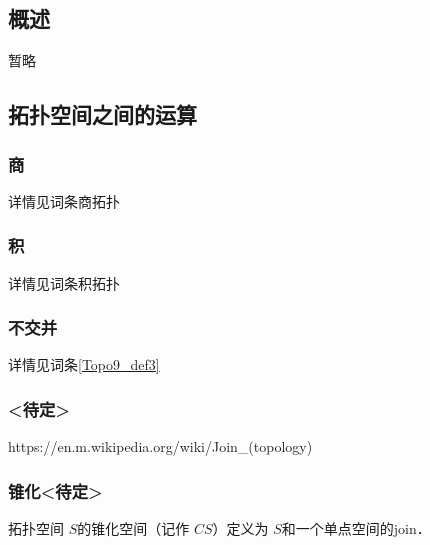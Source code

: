 
\begin{issues}
\issueDraft
\issueTODO
\issueMissDepend
\issueAbstract
\issueNeedCite
\end{issues}

\subsection{概述}

暂略

\subsection{拓扑空间之间的运算}

\subsubsection{商}

详情见词条商拓扑


\subsubsection{积}

详情见词条积拓扑


\subsubsection{不交并}

详情见词条\autoref{Topo9_def3}~


\subsubsection{<待定>}

https://en.m.wikipedia.org/wiki/Join_(topology)


\subsubsection{锥化<待定>}

\begin{definition}{}
拓扑空间 $S$的锥化空间（记作 $C S$）定义为 $S$和一个单点空间的join．
\end{definition}

